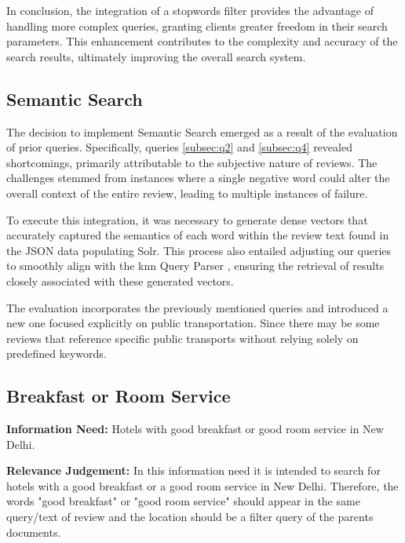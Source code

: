 \documentclass[sigconf]{acmart}
\begin{document}
In conclusion, the integration of a stopwords filter provides the advantage of handling more complex queries, granting clients greater freedom in their search parameters. This enhancement contributes to the complexity and accuracy of the search results, ultimately improving the overall search system.

\renewcommand{\thesubsection}{\arabic{section}.2}
\subsection{Semantic Search}

The decision to implement Semantic Search emerged as a result of the evaluation of prior queries. Specifically, queries \ref{subsec:q2} and \ref{subsec:q4} revealed shortcomings, primarily attributable to the subjective nature of reviews. The challenges stemmed from instances where a single negative word could alter the overall context of the entire review, leading to multiple instances of failure.

To execute this integration, it was necessary to generate dense vectors that accurately captured the semantics of each word within the review text found in the JSON data populating Solr. This process also entailed adjusting our queries to smoothly align with the knn Query Parser \cite{Dense_Vector_Search}, ensuring the retrieval of results closely associated with these generated vectors.

The evaluation incorporates the previously mentioned queries and introduced a new one focused explicitly on public transportation. Since there may be some reviews that reference specific public transports without relying solely on predefined keywords.

\renewcommand{\thesubsection}{\Alph{subsection}}

\setcounter{subsection}{0}
\subsection{Breakfast or Room Service}

\textbf{Information Need:} Hotels with good breakfast or good room service in New Delhi.

\textbf{Relevance Judgement:} In this information need it is intended to search for hotels with a good breakfast or a good room service in New Delhi. Therefore, the words "good breakfast" or "good room service" should appear in the same query/text of review and the location should be a filter query of the parents documents.
\end{document}
